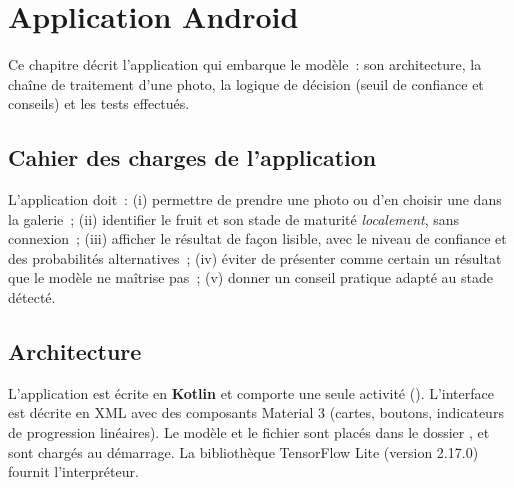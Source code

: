\chapter{Application Android}\label{chap:android}

Ce chapitre décrit l’application qui embarque le modèle~: son architecture, la chaîne de traitement d’une photo, la logique de décision (seuil de confiance et conseils) et les tests effectués.

\section{Cahier des charges de l’application}

L’application doit~: (i) permettre de prendre une photo ou d’en choisir une dans la galerie~; (ii) identifier le fruit et son stade de maturité \emph{localement}, sans connexion~; (iii) afficher le résultat de façon lisible, avec le niveau de confiance et des probabilités alternatives~; (iv) éviter de présenter comme certain un résultat que le modèle ne maîtrise pas~; (v) donner un conseil pratique adapté au stade détecté.

\section{Architecture}

L’application est écrite en \textbf{Kotlin} et comporte une seule activité (). L’interface est décrite en XML avec des composants Material 3 (cartes, boutons, indicateurs de progression linéaires). Le modèle  et le fichier  sont placés dans le dossier , et sont chargés au démarrage. La bibliothèque TensorFlow Lite (version 2.17.0) fournit l’interpréteur.


